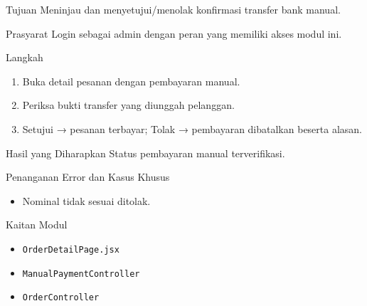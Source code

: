 
\begin{flowsection}{Tujuan}
Meninjau dan menyetujui/menolak konfirmasi transfer bank manual.
\end{flowsection}

\begin{flowsection}{Prasyarat}
Login sebagai admin dengan peran yang memiliki akses modul ini.
\end{flowsection}

\begin{flowsection}{Langkah}
\begin{enumerate}
  \item Buka detail pesanan dengan pembayaran manual.
  \item Periksa bukti transfer yang diunggah pelanggan.
  \item Setujui → pesanan terbayar; Tolak → pembayaran dibatalkan beserta alasan.
\end{enumerate}
\end{flowsection}


\begin{flowsection}{Hasil yang Diharapkan}
Status pembayaran manual terverifikasi.
\end{flowsection}

\begin{flowsection}{Penanganan Error dan Kasus Khusus}
\begin{itemize}
  \item Nominal tidak sesuai ditolak.
\end{itemize}
\end{flowsection}

\begin{flowsection}{Kaitan Modul}
\begin{itemize}
  \item \texttt{OrderDetailPage.jsx}
  \item \texttt{ManualPaymentController}
  \item \texttt{OrderController}
\end{itemize}
\end{flowsection}

